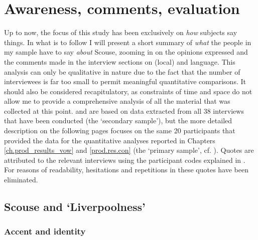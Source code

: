 \chapter{Awareness, comments, evaluation}
\label{prod.res.qual}

Up to now, the focus of this study has been exclusively on \emph{how} subjects say things.
In what is to follow I will present a short summary of \emph{what} the people in my sample have to say \emph{about} Scouse, zooming in on the opinions expressed and the comments made in the interview sections on (local)  and language.
This analysis can only be qualitative in nature due to the fact that the number of interviewees is far too small to permit meaningful quantitative comparisons.
It should also be considered recapitulatory, as constraints of time and space do not allow me to provide a comprehensive analysis of all the material that was collected at this point.
 and  are based on data extracted from all 38 interviews that have been conducted (the `secondary sample'), but the more detailed description on the following pages focuses on the same 20 participants that provided the data for the quantitative analyses reported in Chapters \ref{ch.prod_results_vow} and \ref{prod.res.con} (the `primary sample', cf. ).
Quotes are attributed to the relevant interviews using the participant codes explained in .
For reasons of readability, hesitations and repetitions in these quotes have been eliminated.

\section{Scouse and `Liverpoolness'}

\subsection{Accent and identity}

